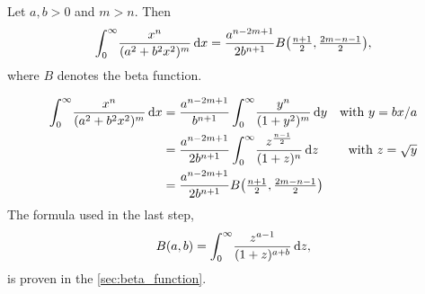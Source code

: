 \begin{Lemma}
  \label{lem:beta_function_formula}
  Let $a, b > 0$ and $m > n$. Then
  \begin{align*}
    \Integ[\infty]{0}{x}{\frac{x^n}{(a^2 + b^2 x^2)^{m}}} =
    \frac{a^{n-2m+1}}{2b^{n+1}}B\bigl(\tfrac{n+1}{2}, \tfrac{2m - n -
    1}{2}\bigr),
  \end{align*}
  where $B$ denotes the beta function.
  \begin{Proof}
    \begin{align*}
      \Integ[\infty]{0}{x}{\frac{x^n}{(a^2 + b^2 x^2)^{m}}} 
      &= \frac{a^{n-2m+1}}{b^{n+1}} \Integ[\infty]{0}{y}{\frac{y^n}{(1 +
  y^2)^m}}
        &\text{with $y = bx / a$} \\
        &= \frac{a^{n - 2m + 1}}{2b^{n+1}}
        \Integ[\infty]{0}{z}{\frac{z^{\frac{n-1}{2}}}{(1 + z)^n}}
        &\text{with $z = \sqrt{y}$}\\
        &= \frac{a^{n-2m+1}}{2b^{n+1}}B\bigl(\tfrac{n+1}{2}, \tfrac{2m - n -
      1}{2}\bigr)
    \end{align*}
    The formula used in the last step,
    \begin{equation*}
      B(a,b) = \Integ[\infty]{0}{z}{\frac{z^{a-1}}{(1+z)^{a+b}}},
    \end{equation*}
    is proven in the \cref{sec:beta_function}.
  \end{Proof}
\end{Lemma}
